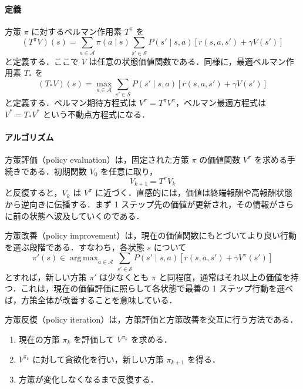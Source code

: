 \paragraph*{定義}
方策 $\pi$ に対するベルマン作用素 $T^\pi$ を
\begin{equation*}
(T^\pi V)(s)
=
\sum_{a \in \mathcal{A}} \pi(a \mid s)
\sum_{s' \in \mathcal{S}} P(s' \mid s,a)
\left[
r(s,a,s') + \gamma V(s')
\right]
\end{equation*}
と定義する．ここで $V$ は任意の状態価値関数である．同様に，最適ベルマン作用素 $T_\ast$ を
\begin{equation*}
(T_\ast V)(s)
=
\max_{a \in \mathcal{A}}
\sum_{s' \in \mathcal{S}} P(s' \mid s,a)
\left[
r(s,a,s') + \gamma V(s')
\right]
\end{equation*}
と定義する．ベルマン期待方程式は $V^\pi = T^\pi V^\pi$，ベルマン最適方程式は $V^\ast = T_\ast V^\ast$ という不動点方程式になる．

\paragraph*{アルゴリズム}
方策評価（policy evaluation）は，固定された方策 $\pi$ の価値関数 $V^\pi$ を求める手続きである．初期関数 $V_0$ を任意に取り，
\begin{equation*}
V_{k+1} = T^\pi V_k
\end{equation*}
と反復すると，$V_k$ は $V^\pi$ に近づく．直感的には，価値は終端報酬や高報酬状態から逆向きに伝播する．まず 1 ステップ先の価値が更新され，その情報がさらに前の状態へ波及していくのである．

方策改善（policy improvement）は，現在の価値関数にもとづいてより良い行動を選ぶ段階である．すなわち，各状態 $s$ について
\begin{equation*}
\pi'(s)
\in
\mathop{\mathrm{arg\,max}}_{a \in \mathcal{A}}
\sum_{s' \in \mathcal{S}} P(s' \mid s,a)
\left[
r(s,a,s') + \gamma V^\pi(s')
\right]
\end{equation*}
とすれば，新しい方策 $\pi'$ は少なくとも $\pi$ と同程度，通常はそれ以上の価値を持つ．これは，現在の価値評価に照らして各状態で最善の 1 ステップ行動を選べば，方策全体が改善することを意味している．

方策反復（policy iteration）は，方策評価と方策改善を交互に行う方法である．
\begin{enumerate}
\item 現在の方策 $\pi_k$ を評価して $V^{\pi_k}$ を求める．
\item $V^{\pi_k}$ に対して貪欲化を行い，新しい方策 $\pi_{k+1}$ を得る．
\item 方策が変化しなくなるまで反復する．
\end{enumerate}


